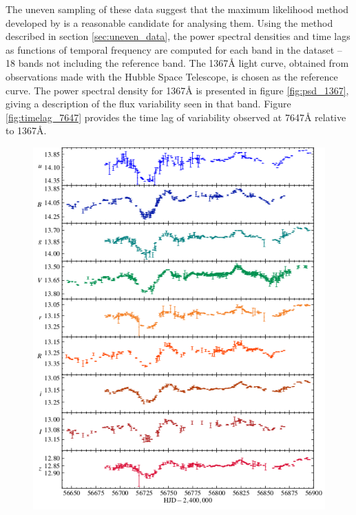\documentclass[11pt,letterpaper]{article}
\begin{document}
The uneven sampling of these data suggest that the maximum likelihood method developed by \cite{2013ApJ...777...24Z} is a reasonable candidate for analysing them. Using the method described in section \ref{sec:uneven_data}, the power spectral densities and time lags as functions of temporal frequency are computed for each band in the dataset -- 18 bands not including the reference band. The 1367\AA$ $ light curve, obtained from observations made with the Hubble Space Telescope, is chosen as the reference curve. The power spectral density for 1367\AA$ $ is presented in figure \ref{fig:psd_1367}, giving a description of the flux variability seen in that band. Figure \ref{fig:timelag_7647} provides the time lag of variability observed at 7647\AA$ $ relative to 1367\AA$ $.

\begin{figure}
    \centering
    \includegraphics[width=1\linewidth]{../img/lightcurves.pdf}
    \label{fig:lightcurves}
\end{figure}
\end{document}
